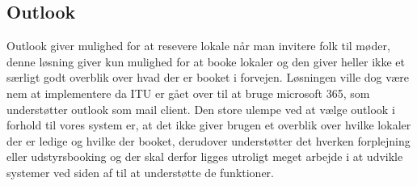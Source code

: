 \subsection{Outlook}
Outlook giver mulighed for at resevere lokale når man invitere folk til møder, denne løsning giver kun mulighed for at booke lokaler og den giver heller ikke et særligt godt overblik over hvad der er booket i forvejen. Løsningen ville dog være nem at implementere da ITU er gået over til at bruge microsoft 365, som understøtter outlook som mail client. Den store ulempe ved at vælge outlook i forhold til vores system er, at det ikke giver brugen et overblik over hvilke lokaler der er ledige og hvilke der booket, derudover understøtter det hverken forplejning eller udstyrsbooking og der skal derfor ligges utroligt meget arbejde i at udvikle systemer ved siden af til at understøtte de funktioner.